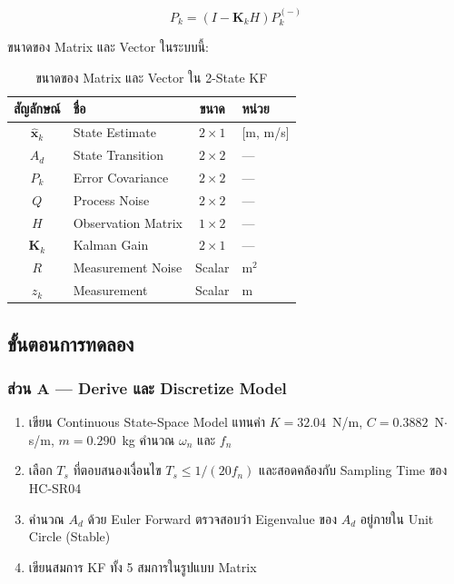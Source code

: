 \begin{equation}
    P_k = \left(I - \mathbf{K}_k H\right) P_k^{(-)}
    \tag{2-State-5: Covariance Update}
    \label{eq:kf2_update_cov}
\end{equation}

ขนาดของ Matrix และ Vector ในระบบนี้:

\begin{table}[htbp]
    \centering
    \caption{ขนาดของ Matrix และ Vector ใน 2-State KF}
    \label{tab:matrix_dims}
    \begin{tabular}{clcl}
        \hline
        \textbf{สัญลักษณ์} & \textbf{ชื่อ} & \textbf{ขนาด} & \textbf{หน่วย} \\
        \hline
        $\hat{\mathbf{x}}_k$ & State Estimate     & $2\times1$ & [m, m/s] \\
        $A_d$                & State Transition   & $2\times2$ & --- \\
        $P_k$                & Error Covariance   & $2\times2$ & --- \\
        $Q$                  & Process Noise      & $2\times2$ & --- \\
        $H$                  & Observation Matrix & $1\times2$ & --- \\
        $\mathbf{K}_k$       & Kalman Gain        & $2\times1$ & --- \\
        $R$                  & Measurement Noise  & Scalar     & m$^2$ \\
        $z_k$                & Measurement        & Scalar     & m \\
        \hline
    \end{tabular}
\end{table}

\subsection{ขั้นตอนการทดลอง}

\subsubsection{ส่วน A --- Derive และ Discretize Model}

\begin{enumerate}
    \item เขียน Continuous State-Space Model แทนค่า $K = 32.04$~N/m,
          $C = 0.3882$~N$\cdot$s/m, $m = 0.290$~kg
          คำนวณ $\omega_n$ และ $f_n$
    \item เลือก $T_s$ ที่ตอบสนองเงื่อนไข $T_s \leq 1/(20 f_n)$
          และสอดคล้องกับ Sampling Time ของ HC-SR04
    \item คำนวณ $A_d$ ด้วย Euler Forward
          ตรวจสอบว่า Eigenvalue ของ $A_d$ อยู่ภายใน Unit Circle (Stable)
    \item เขียนสมการ KF ทั้ง 5 สมการในรูปแบบ Matrix
\end{enumerate}

